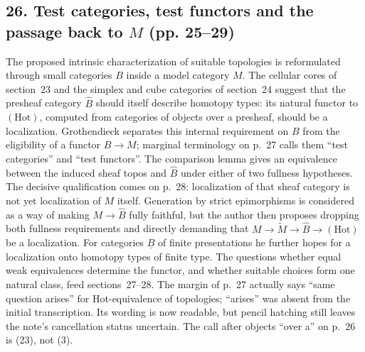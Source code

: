\documentclass[10pt,oneside]{book}
\begin{document}
\subsection*{26. Test categories, test functors and the passage back to $M$ (pp. 25--29)}
The proposed intrinsic characterization of suitable topologies is reformulated through small categories $B$ inside a model category $M$. The cellular cores of section~23 and the simplex and cube categories of section~24 suggest that the presheaf category $\widehat B$ should itself describe homotopy types: its natural functor to $(\mathrm{Hot})$, computed from categories of objects over a presheaf, should be a localization. Grothendieck separates this internal requirement on $B$ from the eligibility of a functor $B\to M$; marginal terminology on p.~27 calls them ``test categories'' and ``test functors''. The comparison lemma gives an equivalence between the induced sheaf topos and $\widehat B$ under either of two fullness hypotheses. The decisive qualification comes on p.~28: localization of that sheaf category is not yet localization of $M$ itself. Generation by strict epimorphisms is considered as a way of making $M\to\widehat B$ fully faithful, but the author then proposes dropping both fullness requirements and directly demanding that $M\to\widetilde M\to\widehat B\to(\mathrm{Hot})$ be a localization. For categories $\underline B$ of finite presentations he further hopes for a localization onto homotopy types of finite type. The questions whether equal weak equivalences determine the functor, and whether suitable choices form one natural class, feed sections~27--28. The margin of p.~27 actually says ``same question arises'' for Hot-equivalence of topologies; ``arises'' was absent from the initial transcription. Its wording is now readable, but pencil hatching still leaves the note's cancellation status uncertain. The call after objects ``over a'' on p.~26 is (23), not (3).
\end{document}
